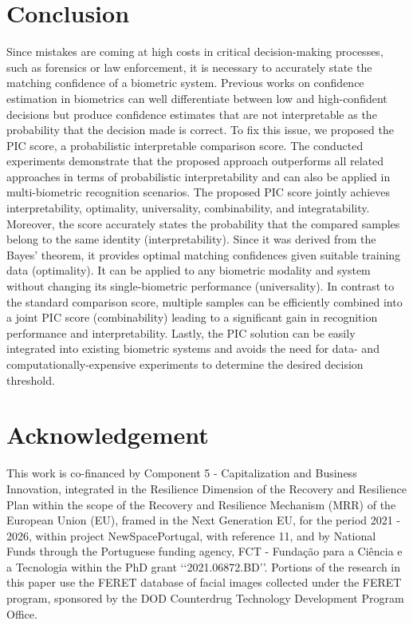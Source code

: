 \documentclass[10pt,twocolumn,letterpaper]{article}
\begin{document}
\section{Conclusion}
\label{sec:Conclusion}


Since mistakes are coming at high costs in critical decision-making processes, such as forensics or law enforcement, it is necessary to accurately state the matching confidence of a biometric system.
Previous works on confidence estimation in biometrics can well differentiate between low and high-confident decisions but produce confidence estimates that are not interpretable as the probability that the decision made is correct.
To fix this issue, we proposed the PIC score, a probabilistic interpretable comparison score.
The conducted experiments demonstrate that the proposed approach outperforms all related approaches in terms of probabilistic interpretability and can also be applied in multi-biometric recognition scenarios.
The proposed PIC score jointly achieves interpretability, optimality, universality, combinability, and integratability.
Moreover, the score accurately states the probability that the compared samples belong to the same identity (interpretability).
Since it was derived from the Bayes' theorem, it provides optimal matching confidences given suitable training data (optimality).
It can be applied to any biometric modality and system without changing its single-biometric performance (universality).
In contrast to the standard comparison score, multiple samples can be efficiently combined into a joint PIC score (combinability) leading to a significant gain in recognition performance and interpretability.
Lastly, the PIC solution can be easily integrated into existing biometric systems and avoids the need for data- and computationally-expensive experiments to determine the desired decision threshold.




\footnotesize{
\section*{Acknowledgement}


This work is co-financed by Component 5 - Capitalization and Business Innovation, integrated in the Resilience Dimension of the Recovery and Resilience Plan within the scope of the Recovery and Resilience Mechanism (MRR) of the European Union (EU), framed in the Next Generation EU, for the period 2021 - 2026, within project NewSpacePortugal, with reference 11, and by National Funds through the Portuguese funding agency, FCT - Fundação para a Ciência e a Tecnologia within the PhD grant ‘‘2021.06872.BD’’.
Portions of the research in this paper use the FERET database of facial images collected under the FERET program, sponsored by the DOD Counterdrug Technology Development Program Office. }



{\small


}
\end{document}
